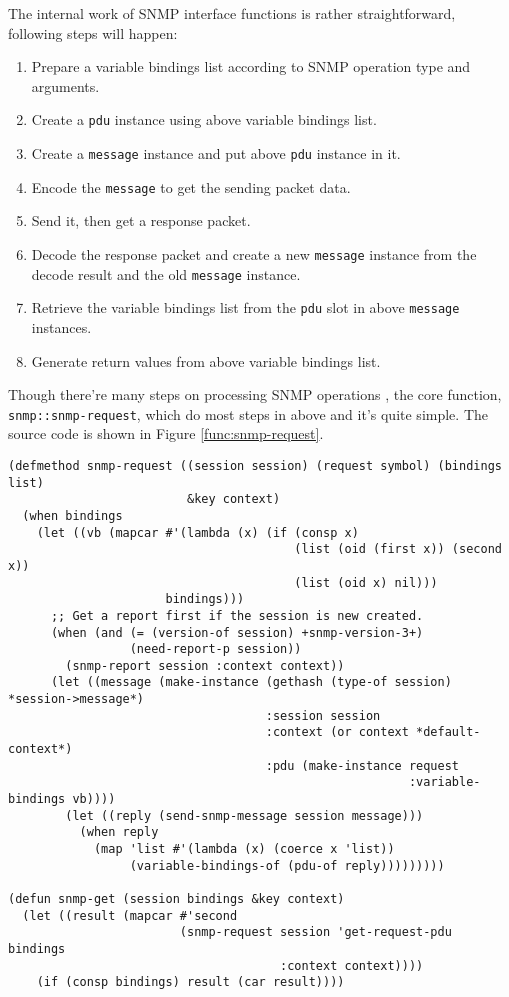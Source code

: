 \documentclass[reprint,natbib,9pt]{sigplanconf}
\begin{document}
The internal work of SNMP interface functions is rather
straightforward, following steps will happen:
\begin{enumerate}
\item Prepare a variable bindings list according to SNMP operation type and arguments.
\item Create a \texttt{pdu} instance using above variable bindings list.
\item Create a \texttt{message} instance and put above \texttt{pdu} instance in it.
\item Encode the \texttt{message} to get the sending packet data.
\item Send it, then get a response packet.
\item Decode the response packet and create a new \texttt{message} instance from the decode result and the old \texttt{message} instance.
\item Retrieve the variable bindings list from the \texttt{pdu} slot in above \texttt{message} instances.
\item Generate return values from above variable bindings list.
\end{enumerate}
Though there're many steps on processing SNMP operations
\cite{RFC:3412}, the core function,
\texttt{snmp::snmp-request}, which do most steps in above and it's quite simple.
The source code is shown in Figure \ref{func:snmp-request}.

\begin{figure*}
\begin{verbatim}
(defmethod snmp-request ((session session) (request symbol) (bindings list)
                         &key context)
  (when bindings
    (let ((vb (mapcar #'(lambda (x) (if (consp x)
                                        (list (oid (first x)) (second x))
                                        (list (oid x) nil)))
                      bindings)))
      ;; Get a report first if the session is new created.
      (when (and (= (version-of session) +snmp-version-3+)
                 (need-report-p session))
        (snmp-report session :context context))
      (let ((message (make-instance (gethash (type-of session) *session->message*)
                                    :session session
                                    :context (or context *default-context*)
                                    :pdu (make-instance request
                                                        :variable-bindings vb))))
        (let ((reply (send-snmp-message session message)))
          (when reply
            (map 'list #'(lambda (x) (coerce x 'list))
                 (variable-bindings-of (pdu-of reply)))))))))

(defun snmp-get (session bindings &key context)
  (let ((result (mapcar #'second
                        (snmp-request session 'get-request-pdu bindings
                                      :context context))))
    (if (consp bindings) result (car result))))
\end{verbatim}
  \caption{The core SNMP function: \texttt{snmp-request}}
  \label{func:snmp-request}
\end{figure*}
\end{document}
